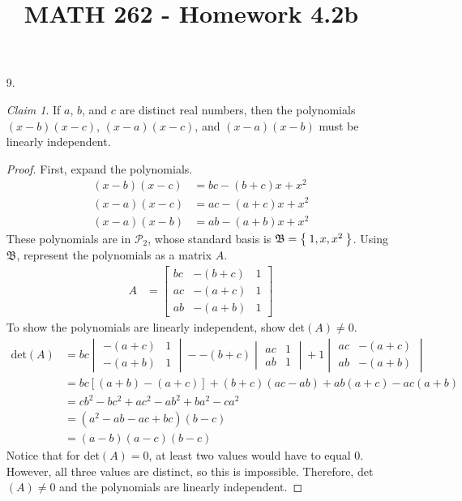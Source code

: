 \documentclass[letterpaper,12pt]{article}
\author{}
\title{MATH 262 - Homework 4.2b}
\date{} %
\theoremstyle{remark}
\newtheorem*{claim}{Claim}
\newcommand{\detthree}[9]{
  #1\begin{vmatrix}
    #5 & #6 \\
    #8 & #9
  \end{vmatrix}
  - #2\begin{vmatrix}
    #4 & #6 \\
    #7 & #9
  \end{vmatrix}
  + #3\begin{vmatrix}
    #4 & #5 \\
    #7 & #8
  \end{vmatrix} %
}
\begin{document}
\maketitle

\begin{enumerate}
  \item[9.]
    \begin{claim}
      If $a$, $b$, and $c$ are distinct real numbers, then the polynomials $(x-b)(x-c)$, $(x-a)(x-c)$, and $(x-a)(x-b)$ must be linearly independent.
    \end{claim}
    \begin{proof}
      First, expand the polynomials.
      \begin{align*}
        (x-b)(x-c) &= bc - (b+c)x + x^2 \\
        (x-a)(x-c) &= ac - (a+c)x + x^2 \\
        (x-a)(x-b) &= ab - (a+b)x + x^2
      \end{align*}
      These polynomials are in $\mathcal{P}_2$, whose standard basis is $\mathfrak{B} = \Set{1, x, x^2}$. Using $\mathfrak{B}$, represent the polynomials as a matrix $A$.
      \begin{align*}
        A &= \begin{bmatrix}
          bc & -(b+c) & 1 \\
          ac & -(a+c) & 1 \\
          ab & -(a+b) & 1
        \end{bmatrix}
      \end{align*}
      To show the polynomials are linearly independent, show det$(A) \ne 0$.
      \begin{align*}
        \text{det}(A) &= \detthree{bc}{-(b+c)}{1}{ac}{-(a+c)}{1}{ab}{-(a+b)}{1} \\
        &= bc[(a + b) - (a + c)] + (b + c)(ac - ab) + ab(a + c) - ac(a + b) \\
        &= cb^2 - bc^2 + ac^2 - ab^2 + ba^2 - ca^2 \\
        &= (a^2 - ab - ac + bc)(b - c) \\
        &= (a - b)(a - c)(b - c)
      \end{align*}
      Notice that for det$(A) = 0$, at least two values would have to equal 0. However, all three values are distinct, so this is impossible. Therefore, det$(A) \ne 0$ and the polynomials are linearly independent.
    \end{proof}
\end{enumerate}
\end{document}
